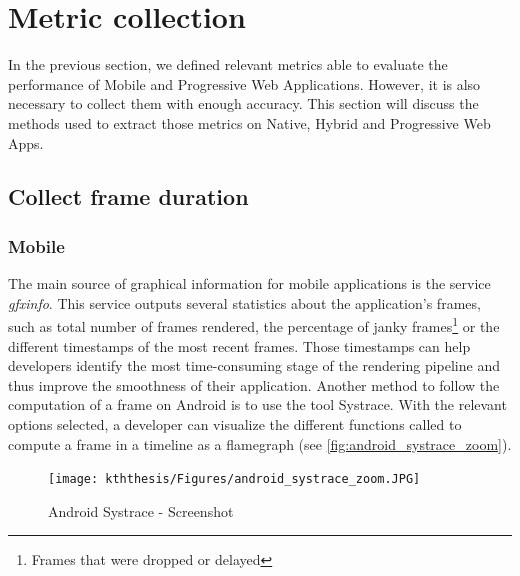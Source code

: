 \documentclass{kththesis}
\begin{document}
\section{Metric collection}

In the previous section, we defined relevant metrics able to evaluate the performance of Mobile and Progressive Web Applications. However, it is also necessary to collect them with enough accuracy. This section will discuss the methods used to extract those metrics on Native, Hybrid and Progressive Web Apps. 
\subsection{Collect frame duration}
\label{method:smoothness}

\subsubsection{Mobile} \label{collection:android}
    The main source of graphical information for mobile applications is the service \textit{gfxinfo}. This service outputs several statistics about the application's frames, such as total number of frames rendered, the percentage of janky frames\footnote{Frames that were dropped or delayed} or the different timestamps of the most recent frames. Those timestamps can help developers identify the most time-consuming stage of the rendering pipeline and thus improve the smoothness of their application. \newline
    \indent Another method to follow the computation of a frame on Android is to use the tool Systrace. With the relevant options selected, a developer can visualize the different functions called to compute a frame in a timeline as a flamegraph (see \autoref{fig:android_systrace_zoom}).
    
    \begin{figure}
        \centering
        \texttt{[image: kththesis/Figures/android\_systrace\_zoom.JPG]}
        \caption{Android Systrace - Screenshot}
        \label{fig:android_systrace_zoom}
    \end{figure}
    
\end{document}

